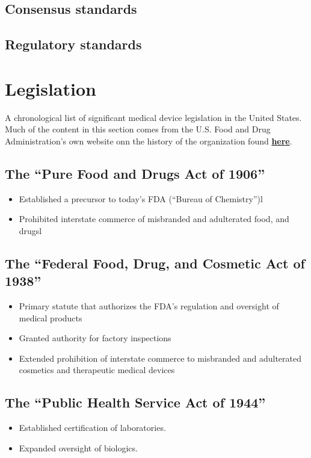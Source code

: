 \documentclass[11pt]{book}
\begin{document}
\subsection{Consensus standards}
\subsection{Regulatory standards}

\newpage
\section{Legislation}
A chronological list of significant medical device legislation in the United States. Much of the content in this section comes from the U.S. Food and Drug Administration's own website onn the history of the organization found \href{https://www.fda.gov/MedicalDevices/DeviceRegulationandGuidance/Overview/ucm618375.htm}{\textbf{here}}.

\subsection{The ``Pure Food and Drugs Act of 1906''}
\begin{itemize}
	\item Established a precursor to today’s FDA (``Bureau of Chemistry'')l
	\item Prohibited interstate commerce of misbranded and adulterated food, and drugsl
\end{itemize}

\subsection{The ``Federal Food, Drug, and Cosmetic Act of 1938''}
\begin{itemize}
	\item Primary statute that authorizes the FDA’s regulation and oversight of medical products
	\item Granted authority for factory inspections
	\item Extended prohibition of interstate commerce to misbranded and adulterated cosmetics and therapeutic medical devices
\end{itemize}

\subsection{The ``Public Health Service Act of 1944''}
\begin{itemize}
	\item Established certification of laboratories.
	\item Expanded oversight of biologics.
\end{itemize}
\end{document}
